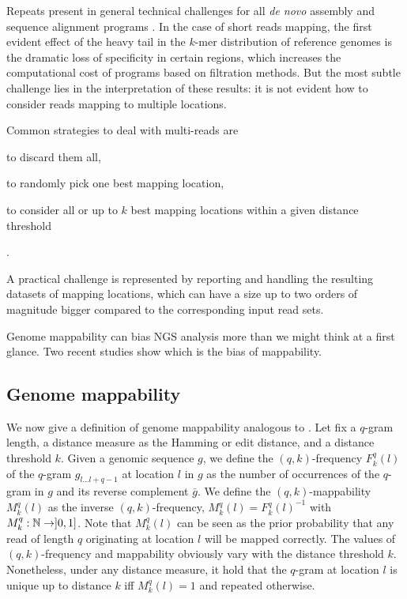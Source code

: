 Repeats present in general technical challenges for all \emph{de novo} assembly and sequence alignment programs \citep{Lee2012}.
In the case of short reads mapping, the first evident effect of the heavy tail in the $k$-mer distribution of reference genomes is the dramatic loss of specificity in certain regions, which increases the computational cost of programs based on filtration methods.
But the most subtle challenge lies in the interpretation of these results: it is not evident how to consider reads mapping to multiple locations.

Common strategies to deal with multi-reads are
\begin{inparaenum}[(i)]
\item to discard them all,
\item to randomly pick one best mapping location,
\item to consider all or up to $k$ best mapping locations within a given distance threshold
\end{inparaenum}
\citep{Treangen2011}.

A practical challenge is represented by reporting and handling the resulting datasets of mapping locations, which can have a size up to two orders of magnitude bigger compared to the corresponding input read sets.

Genome mappability can bias NGS analysis more than we might think at a first glance.
Two recent studies \citep{Derrien2012, Lee2012} show which is the bias of mappability.



\subsection{Genome mappability}

We now give a definition of genome mappability analogous to \citep{Derrien2012}.
Let fix a $q$-gram length, a distance measure as the Hamming or edit distance, and a distance threshold $k$.
Given a genomic sequence $g$, we define the $(q,k)$-frequency $F^q_k(l)$ of the $q$-gram $g_{l \dots l+q-1}$ at location $l$ in $g$ as the number of occurrences of the $q$-gram in $g$ and its reverse complement $\bar{g}$.
We define the $(q,k)$-mappability $M^q_k(l)$ as the inverse $(q,k)$-frequency, \ie $M^q_k(l) = {F^q_k(l)}^{-1}$ with $M^q_k : \mathbb {N} \rightarrow ]0,1]$.
Note that $M^q_k(l)$ can be seen as the prior probability that any read of length $q$ originating at location $l$ will be mapped correctly.
The values of $(q,k)$-frequency and mappability obviously vary with the distance threshold $k$. Nonetheless, under any distance measure, it hold that the $q$-gram at location $l$ is unique up to distance $k$ iff $M^q_k(l) = 1$ and repeated otherwise.

